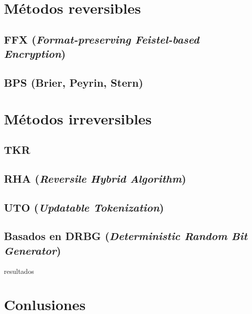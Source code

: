 \documentclass[11pt]{llncs}
\begin{document}
  \section{Métodos reversibles}

  \subsection{FFX (\textit{Format-preserving Feistel-based Encryption})}

  \subsection{BPS (Brier, Peyrin, Stern)}

  \section{Métodos irreversibles}

  \subsection{TKR}

  \subsection{RHA (\textit{Reversile Hybrid Algorithm})}

  \subsection{UTO (\textit{Updatable Tokenization})}

  \subsection{Basados en DRBG (\textit{Deterministic Random Bit Generator})}

  {resultados}

  \section{Conlusiones}

  
  
\end{document}
